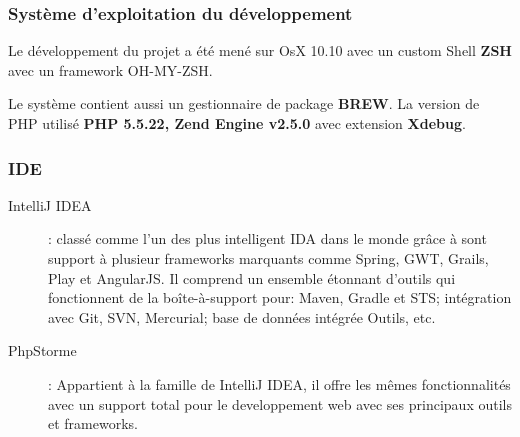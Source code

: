 \documentclass[12pt, ChapStyle1, oneside]{./Styles/Dea_Gsm}
\begin{document}
\subsubsection{Système d'exploitation du développement}
Le développement du projet a été mené sur OsX 10.10 avec un custom Shell \textbf{ZSH} avec un framework OH-MY-ZSH.

Le système contient aussi un gestionnaire de package \textbf{BREW}.
La version de PHP utilisé \textbf{PHP 5.5.22, Zend Engine v2.5.0} avec extension \textbf{Xdebug}.
\subsubsection{IDE}
\begin{description}
\item[IntelliJ IDEA] : classé comme l’un des plus intelligent IDA dans le monde grâce à sont support à plusieur frameworks marquants comme Spring, GWT, Grails, Play et AngularJS.
Il comprend un ensemble étonnant d'outils qui fonctionnent de la boîte-à-support pour: Maven, Gradle et STS; intégration avec Git, SVN, Mercurial; base de données intégrée Outils, etc.
\item[PhpStorme] : Appartient à la famille de IntelliJ IDEA, il offre les mêmes fonctionnalités avec un support total pour le developpement web avec ses principaux outils et frameworks.
\end{description}
\end{document}
